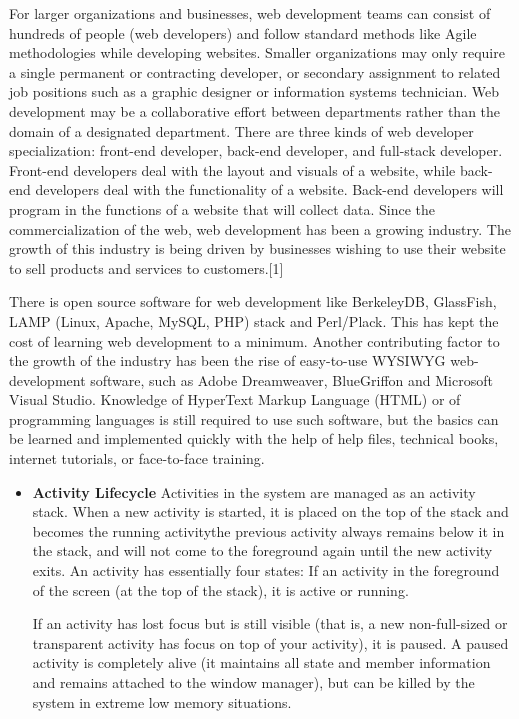For larger organizations and businesses, web development teams can consist of hundreds of people (web developers) and follow standard methods like Agile methodologies while developing websites. Smaller organizations may only require a single permanent or contracting developer, or secondary assignment to related job positions such as a graphic designer or information systems technician. Web development may be a collaborative effort between departments rather than the domain of a designated department. There are three kinds of web developer specialization: front-end developer, back-end developer, and full-stack developer. Front-end developers deal with the layout and visuals of a website, while back-end developers deal with the functionality of a website. Back-end developers will program in the functions of a website that will collect data.
Since the commercialization of the web, web development has been a growing industry. The growth of this industry is being driven by businesses wishing to use their website to sell products and services to customers.[1]

There is open source software for web development like BerkeleyDB, GlassFish, LAMP (Linux, Apache, MySQL, PHP) stack and Perl/Plack. This has kept the cost of learning web development to a minimum. Another contributing factor to the growth of the industry has been the rise of easy-to-use WYSIWYG web-development software, such as Adobe Dreamweaver, BlueGriffon and Microsoft Visual Studio. Knowledge of HyperText Markup Language (HTML) or of programming languages is still required to use such software, but the basics can be learned and implemented quickly with the help of help files, technical books, internet tutorials, or face-to-face training.



\begin{itemize}

\item \textbf{Activity Lifecycle}
Activities in the system are managed as an activity stack. When a new activity
is started, it is placed on the top of the stack and becomes the running activitythe previous activity always remains below it in the stack, and will not come to
the foreground again until the new activity exits. An activity has essentially four
states:
If an activity in the foreground of the screen (at the top of the stack), it is
active or running.

If an activity has lost focus but is still visible (that is, a new non-full-sized or
transparent activity has focus on top of your activity), it is paused. A paused
activity is completely alive (it maintains all state and member information and
remains attached to the window manager), but can be killed by the system in
extreme low memory situations.


\end{itemize}

